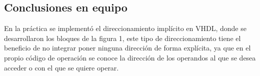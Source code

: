 \documentclass[table]{scrartcl}
\begin{document}
\subsection*{Conclusiones en equipo}\label{sec:concl-en-equipo}

En la práctica se implementó el direccionamiento implícito en VHDL, donde se
desarrollaron los bloques de la figura 1, este tipo de direccionamiento tiene el
beneficio de no integrar poner ninguna dirección de forma explícita, ya que en
el propio código de operación se conoce la dirección de los operandos al que se
desea acceder o con el que se quiere operar.
\nocite{*}
\printbibliography{}
\newpage{}

\listoftables{}
\listoffigures{}
\listoflistings{}
\end{document}
